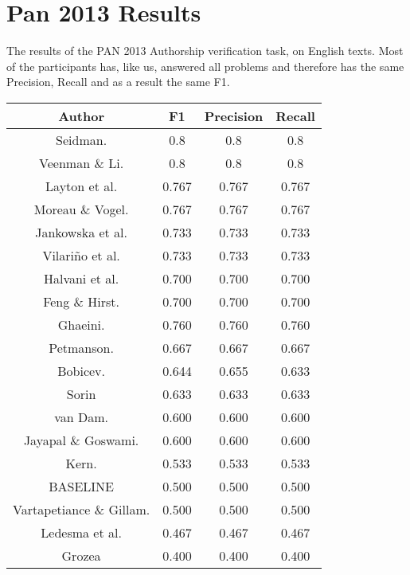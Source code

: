 \section{Pan 2013 Results} \label{sec:appendix:pan_2013_results}
The results of the PAN 2013 Authorship verification task, on English texts. Most
of the participants has, like us, answered all problems and therefore has the
same Precision, Recall and as a result the same F1.

\begin{center}
\begin{tabular}{|c|c|c|c|}
\hline
\textbf{Author}          & \textbf{F1} & \textbf{Precision} & \textbf{Recall} \\ \hline
Seidman.                 & 0.8         & 0.8                & 0.8             \\ \hline
Veenman \& Li.           & 0.8         & 0.8                & 0.8             \\ \hline
Layton et al.            & 0.767       & 0.767              & 0.767           \\ \hline
Moreau \& Vogel.         & 0.767       & 0.767              & 0.767           \\ \hline
Jankowska et al.         & 0.733       & 0.733              & 0.733           \\ \hline
Vilariño et al.          & 0.733       & 0.733              & 0.733           \\ \hline
Halvani et al.           & 0.700       & 0.700              & 0.700           \\ \hline
Feng \& Hirst.           & 0.700       & 0.700              & 0.700           \\ \hline
Ghaeini.                 & 0.760       & 0.760              & 0.760           \\ \hline
Petmanson.               & 0.667       & 0.667              & 0.667           \\ \hline
Bobicev.                 & 0.644       & 0.655              & 0.633           \\ \hline
Sorin                    & 0.633       & 0.633              & 0.633           \\ \hline
van Dam.                 & 0.600       & 0.600              & 0.600           \\ \hline
Jayapal \& Goswami.      & 0.600       & 0.600              & 0.600           \\ \hline
Kern.                    & 0.533       & 0.533              & 0.533           \\ \hline
BASELINE                 & 0.500       & 0.500              & 0.500           \\ \hline
Vartapetiance \& Gillam. & 0.500       & 0.500              & 0.500           \\ \hline
Ledesma et al.           & 0.467       & 0.467              & 0.467           \\ \hline
Grozea                   & 0.400       & 0.400              & 0.400           \\ \hline
\end{tabular}
\end{center}

